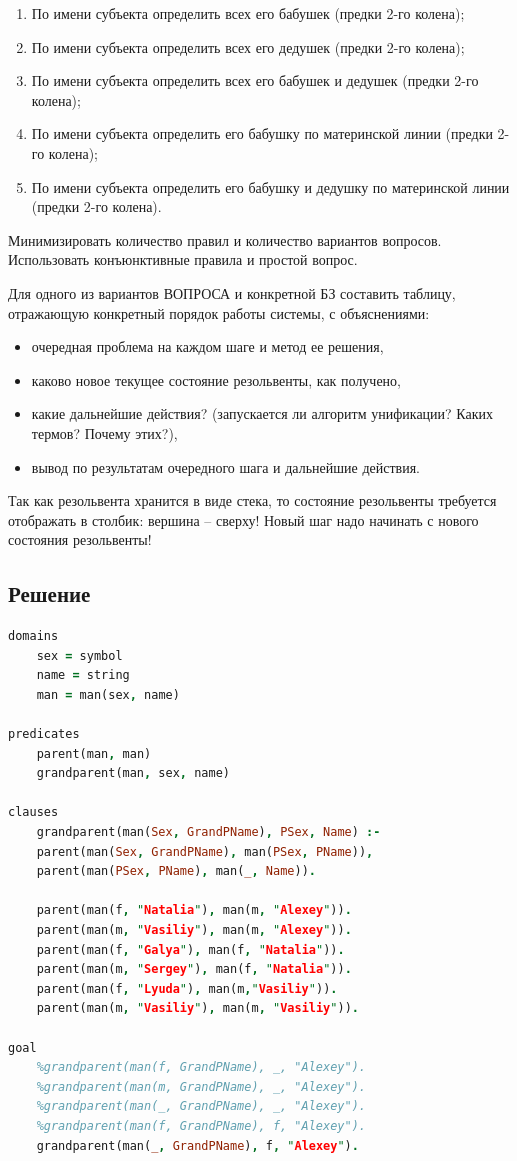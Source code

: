 \documentclass[12pt]{report}
\begin{document}
\begin{enumerate}
	\item По имени субъекта определить всех его бабушек (предки 2-го колена);
	\item По имени субъекта определить всех его дедушек (предки 2-го колена);
	\item По имени субъекта определить всех его бабушек и дедушек (предки 2-го колена);
	\item По имени субъекта определить его бабушку по материнской линии (предки 2-го колена);
	\item По имени субъекта определить его бабушку и дедушку по материнской линии (предки 2-го колена).
\end{enumerate}

Минимизировать количество правил и количество вариантов вопросов. Использовать конъюнктивные правила и простой вопрос.

Для одного из вариантов ВОПРОСА и конкретной БЗ составить таблицу, отражающую конкретный порядок работы системы, с объяснениями:

\begin{itemize}
	\item очередная проблема на каждом шаге и метод ее решения,
	\item каково новое текущее состояние резольвенты, как получено,
	\item какие дальнейшие действия? (запускается ли алгоритм унификации? Каких термов? Почему этих?),
	\item вывод по результатам очередного шага и дальнейшие действия.
\end{itemize}

Так как резольвента хранится в виде стека, то состояние резольвенты требуется отображать в столбик: вершина – сверху! Новый шаг надо начинать с нового состояния резольвенты!

\subsection*{Решение}
\begin{lstlisting}[language=prolog]
domains
	sex = symbol
	name = string
	man = man(sex, name)

predicates
	parent(man, man)
	grandparent(man, sex, name)
	
clauses
	grandparent(man(Sex, GrandPName), PSex, Name) :-
	parent(man(Sex, GrandPName), man(PSex, PName)),
	parent(man(PSex, PName), man(_, Name)).
	
	parent(man(f, "Natalia"), man(m, "Alexey")).
	parent(man(m, "Vasiliy"), man(m, "Alexey")).
	parent(man(f, "Galya"), man(f, "Natalia")).
	parent(man(m, "Sergey"), man(f, "Natalia")).
	parent(man(f, "Lyuda"), man(m,"Vasiliy")).
	parent(man(m, "Vasiliy"), man(m, "Vasiliy")).

goal
	%grandparent(man(f, GrandPName), _, "Alexey").
	%grandparent(man(m, GrandPName), _, "Alexey").
	%grandparent(man(_, GrandPName), _, "Alexey").
	%grandparent(man(f, GrandPName), f, "Alexey").
	grandparent(man(_, GrandPName), f, "Alexey").
\end{lstlisting}
\end{document}
